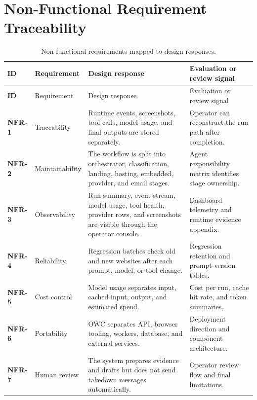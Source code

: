 \section{Non-Functional Requirement Traceability}

\begin{longtable}{>{\raggedright\arraybackslash\bfseries}p{1.8cm}
                  >{\raggedright\arraybackslash}p{3.8cm}
                  >{\raggedright\arraybackslash}p{4.3cm}
                  >{\raggedright\arraybackslash}p{4.1cm}}
\caption{Non-functional requirements mapped to design responses.}
\label{tab:nonfunctional-traceability}\\
\toprule
\rowcolor{accent!8}
ID & Requirement & Design response & Evaluation or review signal \\
\midrule
\endfirsthead
\toprule
\rowcolor{accent!8}
ID & Requirement & Design response & Evaluation or review signal \\
\midrule
\endhead
\bottomrule
\endfoot
NFR-1 & Traceability & Runtime events, screenshots, tool calls, model usage,
and final outputs are stored separately. & Operator can reconstruct the run
path after completion. \\
NFR-2 & Maintainability & The workflow is split into orchestrator,
classification, landing, hosting, embedded, provider, and email stages. &
Agent responsibility matrix identifies stage ownership. \\
NFR-3 & Observability & Run summary, event stream, model usage, tool health,
provider rows, and screenshots are visible through the operator console. &
Dashboard telemetry and runtime evidence appendix. \\
NFR-4 & Reliability & Regression batches check old and new websites after each
prompt, model, or tool change. & Regression retention and prompt-version
tables. \\
NFR-5 & Cost control & Model usage separates input, cached input, output, and
estimated spend. & Cost per run, cache hit rate, and token summaries. \\
NFR-6 & Portability & OWC separates API, browser
tooling, workers, database, and external services. & Deployment direction and
component architecture. \\
NFR-7 & Human review & The system prepares evidence and drafts but does not
send takedown messages automatically. & Operator review flow and final
limitations. \\
\end{longtable}

